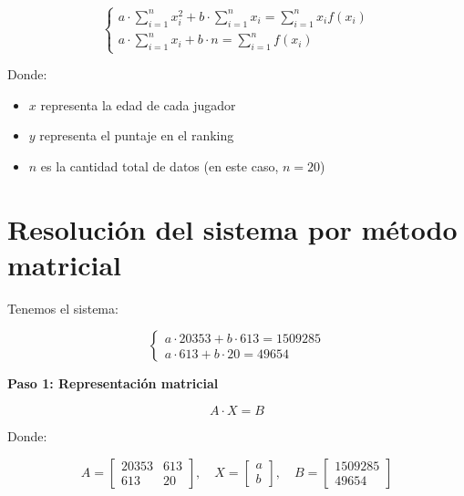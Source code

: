 \documentclass[12pt]{article}
\begin{document}
        \[
        \left\{
            \begin{array}{l}
                a \cdot \sum\limits_{i=1}^{n} x_i^2 + b \cdot \sum\limits_{i=1}^{n} x_i = \sum\limits_{i=1}^{n} x_i f(x_i) \\
                a \cdot \sum\limits_{i=1}^{n} x_i + b \cdot n = \sum\limits_{i=1}^{n} f(x_i)
            \end{array}
        \right.
        \]



        Donde:

        \begin{itemize}
            \item $x$ representa la edad de cada jugador
            \item $y$ representa el puntaje en el ranking
            \item $n$ es la cantidad total de datos (en este caso, $n = 20$)
        \end{itemize}

\section*{Resolución del sistema por método matricial}

    Tenemos el sistema:

    \[
    \left\{
    \begin{array}{l}
    a \cdot 20353 + b \cdot 613 = 1509285 \\
    a \cdot 613 + b \cdot 20 = 49654
    \end{array}
    \right.
    \]

    \vspace{0.3cm}
    \textbf{Paso 1: Representación matricial}

    \[
    A \cdot X = B
    \]

    Donde:

    \[
    A = 
    \begin{bmatrix}
    20353 & 613 \\
    613 & 20
    \end{bmatrix}, \quad
    X = 
    \begin{bmatrix}
    a \\
    b
    \end{bmatrix}, \quad
    B = 
    \begin{bmatrix}
    1509285 \\
    49654
    \end{bmatrix}
    \]
\end{document}

